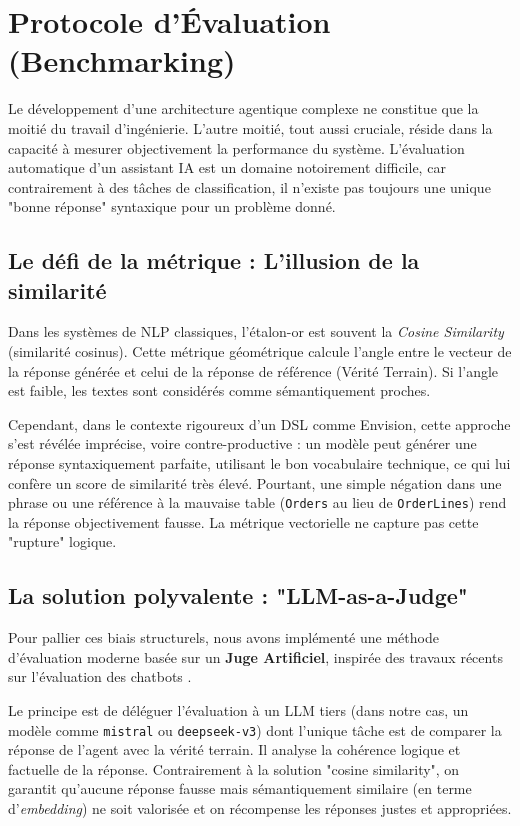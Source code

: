 \section{Protocole d'Évaluation (Benchmarking)}

Le développement d'une architecture agentique complexe ne constitue que la moitié du travail d'ingénierie. L'autre moitié, tout aussi cruciale, réside dans la capacité à mesurer objectivement la performance du système. L'évaluation automatique d'un assistant IA est un domaine notoirement difficile, car contrairement à des tâches de classification, il n'existe pas toujours une unique "bonne réponse" syntaxique pour un problème donné.

\subsection{Le défi de la métrique : L'illusion de la similarité}

Dans les systèmes de NLP classiques, l'étalon-or est souvent la \textit{Cosine Similarity} (similarité cosinus). Cette métrique géométrique calcule l'angle entre le vecteur de la réponse générée et celui de la réponse de référence (Vérité Terrain). Si l'angle est faible, les textes sont considérés comme sémantiquement proches.

Cependant, dans le contexte rigoureux d'un DSL comme Envision, cette approche s'est révélée imprécise, voire contre-productive : un modèle peut générer une réponse syntaxiquement parfaite, utilisant le bon vocabulaire technique, ce qui lui confère un score de similarité très élevé. Pourtant, une simple négation dans une phrase ou une référence à la mauvaise table (\texttt{Orders} au lieu de \texttt{OrderLines}) rend la réponse objectivement fausse. La métrique vectorielle ne capture pas cette "rupture" logique.

\subsection{La solution polyvalente : "LLM-as-a-Judge"}

Pour pallier ces biais structurels, nous avons implémenté une méthode d'évaluation moderne basée sur un \textbf{Juge Artificiel}, inspirée des travaux récents sur l'évaluation des chatbots \cite{Zheng2023}. 

Le principe est de déléguer l'évaluation à un LLM tiers (dans notre cas, un modèle comme \texttt{mistral} ou \texttt{deepseek-v3}) dont l'unique tâche est de comparer la réponse de l'agent avec la vérité terrain. Il analyse la cohérence logique et factuelle de la réponse. Contrairement à la solution "cosine similarity", on garantit qu'aucune réponse fausse mais sémantiquement similaire (en terme d'\textit{embedding}) ne soit valorisée et on récompense les réponses justes et appropriées. 

